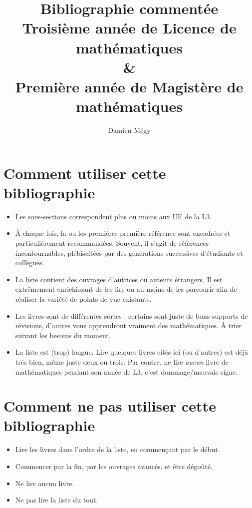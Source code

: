 \documentclass{article}
\begin{document}
\author{Damien Mégy}
\title{Bibliographie commentée\\Troisième année de Licence de mathématiques \\ \&\\ Première année de Magistère de mathématiques}

\maketitle
\tableofcontents

\section*{Comment utiliser cette bibliographie}
\begin{itemize}
\item Les sous-sections correspondent plus ou moins aux UE de la L3.
\item À chaque fois, la ou les premières première référence sont encadrées et  particulièrement recommandées. Souvent, il s'agit de références incontournables, plébiscitées par des générations successives d'étudiants et collègues. 
\item La liste contient des ouvrages d'autrices ou auteurs étrangers. Il est  extrêmement enrichissant de les lire ou au moins de les parcourir afin de réaliser la variété de points de vue existants.
\item Les livres sont de différentes sortes : certains sont juste de bons supports de révisions, d'autres vous apprendront vraiment des mathématiques. À trier suivant les besoins du moment.
\item La liste est (trop) longue. Lire quelques livres cités ici (ou d'autres) est déjà très bien, même juste deux ou trois. Par contre, ne lire \emph{aucun} livre de mathématiques pendant son année de L3, c'est dommage/mauvais signe. 
\end{itemize}

\section*{Comment ne pas utiliser cette bibliographie}
\begin{itemize}
\item Lire les livres dans l'ordre de la liste, en commençant par le début.
\item Commencer par la fin, par les ouvrages avancés, et être dégoûté.
\item Ne lire aucun livre.
\item Ne pas lire la liste du tout.
\end{itemize}
\end{document}
